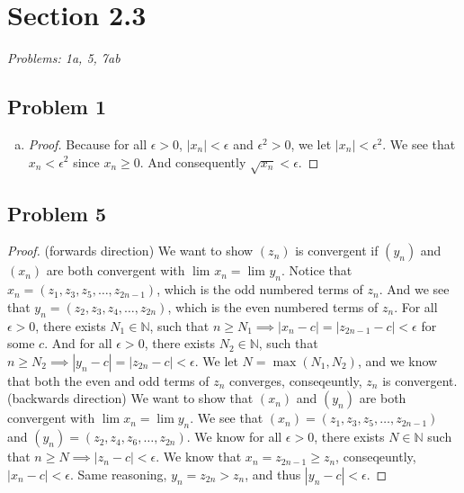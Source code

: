 \documentclass[12pt]{article}
\begin{document}

\section*{Section 2.3}
\textit{Problems: 1a, 5, 7ab}
\subsection*{Problem 1}
\begin{enumerate}[a).]
    \item {
    \begin{proof}
        Because for all $\epsilon > 0$, $|x_n| < \epsilon$ and $\epsilon^2 > 0$, we let $|x_n| < \epsilon^2$.
        We see that $x_n < \epsilon^2$ since $x_n \ge 0$. And consequently $\sqrt{x_n} < \epsilon$. 
    \end{proof}
    }
\end{enumerate}

\subsection*{Problem 5}
        \begin{proof}
            (forwards direction) We want to show $(z_n)$ is convergent if $(y_n)$ and $(x_n)$ are both convergent with $\lim_{}x_n = \lim_{}y_n$. 
            Notice that $x_n = (z_1, z_3, z_5, \dots, z_{2n-1})$, which is the odd numbered terms of $z_n$. 
            And we see that $y_n = (z_2, z_3, z_4, \dots, z_{2n})$, which is the even numbered terms of $z_n$. 
            For all $\epsilon > 0$, there exists $N_1 \in \mathbb{N}$, such that $ n \ge N_1 \implies |x_n - c| = |z_{2n-1} - c|< \epsilon$ for some $c$. 
            And for all $\epsilon > 0$, there exists $N_2 \in \mathbb{N}$, such that $ n \ge N_2 \implies |y_n - c| = |z_{2n} - c| < \epsilon$.
            We let $N = \max{(N_1, N_2)}$, and we know that both the even and odd terms of $z_n$ converges, conseqeuntly, $z_n$ is convergent.\\

            (backwards direction) We want to show that $(x_n)$ and $(y_n)$ are both convergent with $\lim{}x_n = \lim{}y_n$.
            We see that $(x_n) = (z_1, z_3, z_5, \dots, z_{2n-1})$ and $(y_n) = (z_2, z_4, z_6, \dots, z_{2n})$. 
            We know for all $\epsilon > 0$, there exists $N \in \mathbb{N}$ such that $n \ge N \implies |z_n - c| < \epsilon$.
            We know that $x_n = z_{2n-1} \ge z_{n}$, conseqeuntly, $|x_n - c| < \epsilon$. 
            Same reasoning, $y_n = z_{2n} > z_n$, and thus $|y_n - c| < \epsilon$. 
        \end{proof}
\end{document}
